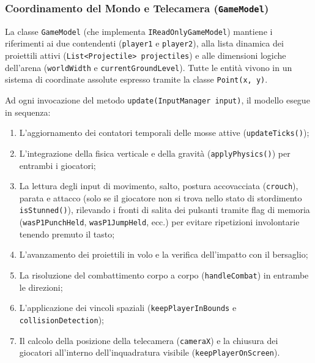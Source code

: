\documentclass[11pt, a4paper]{article}
\begin{document}
\subsubsection{Coordinamento del Mondo e Telecamera (\texttt{GameModel})}
La classe \texttt{GameModel} (che implementa \texttt{IReadOnlyGameModel}) mantiene i riferimenti ai due contendenti (\texttt{player1} e \texttt{player2}), alla lista dinamica dei proiettili attivi (\texttt{List<Projectile> projectiles}) e alle dimensioni logiche dell'arena (\texttt{worldWidth} e \texttt{currentGroundLevel}). Tutte le entità vivono in un sistema di coordinate assolute espresso tramite la classe \texttt{Point(x, y)}.

Ad ogni invocazione del metodo \texttt{update(InputManager input)}, il modello esegue in sequenza:
\begin{enumerate}
    \item L'aggiornamento dei contatori temporali delle mosse attive (\texttt{updateTicks()});
    \item L'integrazione della fisica verticale e della gravità (\texttt{applyPhysics()}) per entrambi i giocatori;
    \item La lettura degli input di movimento, salto, postura accovacciata (\texttt{crouch}), parata e attacco (solo se il giocatore non si trova nello stato di stordimento \texttt{isStunned()}), rilevando i fronti di salita dei pulsanti tramite flag di memoria (\texttt{wasP1PunchHeld}, \texttt{wasP1JumpHeld}, ecc.) per evitare ripetizioni involontarie tenendo premuto il tasto;
    \item L'avanzamento dei proiettili in volo e la verifica dell'impatto con il bersaglio;
    \item La risoluzione del combattimento corpo a corpo (\texttt{handleCombat}) in entrambe le direzioni;
    \item L'applicazione dei vincoli spaziali (\texttt{keepPlayerInBounds} e \texttt{collisionDetection});
    \item Il calcolo della posizione della telecamera (\texttt{cameraX}) e la chiusura dei giocatori all'interno dell'inquadratura visibile (\texttt{keepPlayerOnScreen}).
\end{enumerate}
\end{document}
